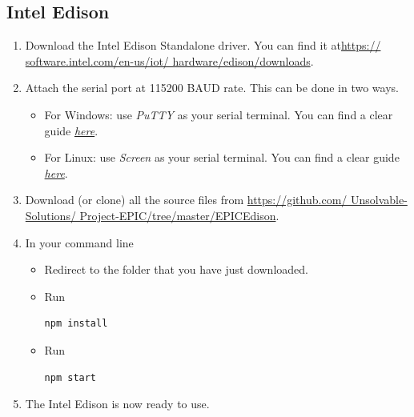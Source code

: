 \documentclass[a4paper,12pt,titlepage]{article}
\begin{document}
\subsection{Intel Edison}
\begin{enumerate}
\item Download the Intel Edison Standalone driver. You can find it at\newline \url{https:// software.intel.com/en-us/iot/ hardware/edison/downloads}.
\item Attach the serial port at 115200 BAUD rate. This can be done in two ways.
\begin{itemize}
    \item For Windows: use \textit{PuTTY} as your serial terminal. You can find a clear guide  \href{https://software.intel.com/en-us/setting-up-serial-terminal-on-system-with-windows}{\textit{here}}.
    \item For Linux: use \textit{Screen} as your serial terminal. You can find a clear guide 
     \href{https://software.intel.com/en-us/setting-up-serial-terminal-on-system-with-linux}{\textit{ here}}.
\end{itemize}
\item Download (or clone) all the source files from \url{https://github.com/ Unsolvable-Solutions/ Project-EPIC/tree/master/EPICEdison}.
\item In your command line
\begin{itemize}
\item Redirect to the folder that you have just downloaded.
\item Run
\begin{verbatim}
npm install
\end{verbatim}
\item Run 
\begin{verbatim} 
npm start 
\end{verbatim}
\end{itemize}

\item The Intel Edison is now ready to use.
\end{enumerate}
\end{document}
